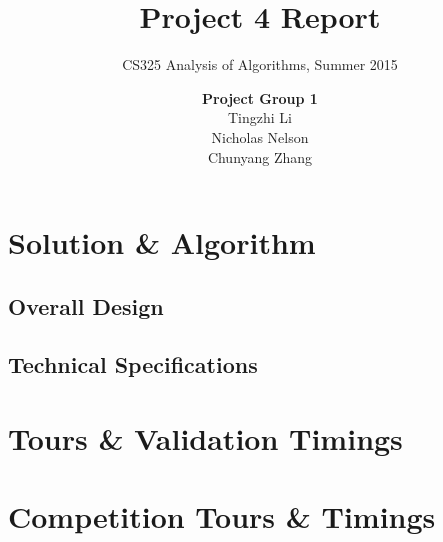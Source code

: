 \documentclass[11pt]{scrreprt}
\title{\textbf{Project 4 Report}}
\subtitle{CS325 Analysis of Algorithms, Summer 2015}
\author{\textsf{\textbf{Project Group 1}}\\
		\textsf{Tingzhi Li}\\
		\textsf{Nicholas Nelson}\\
		\textsf{Chunyang Zhang}}
\date{}
\begin{document}
\maketitle

\chapter{Solution \& Algorithm}
\section{Overall Design}

\section{Technical Specifications}

\chapter{Tours \& Validation Timings}

\chapter{Competition Tours \& Timings}
\end{document}
